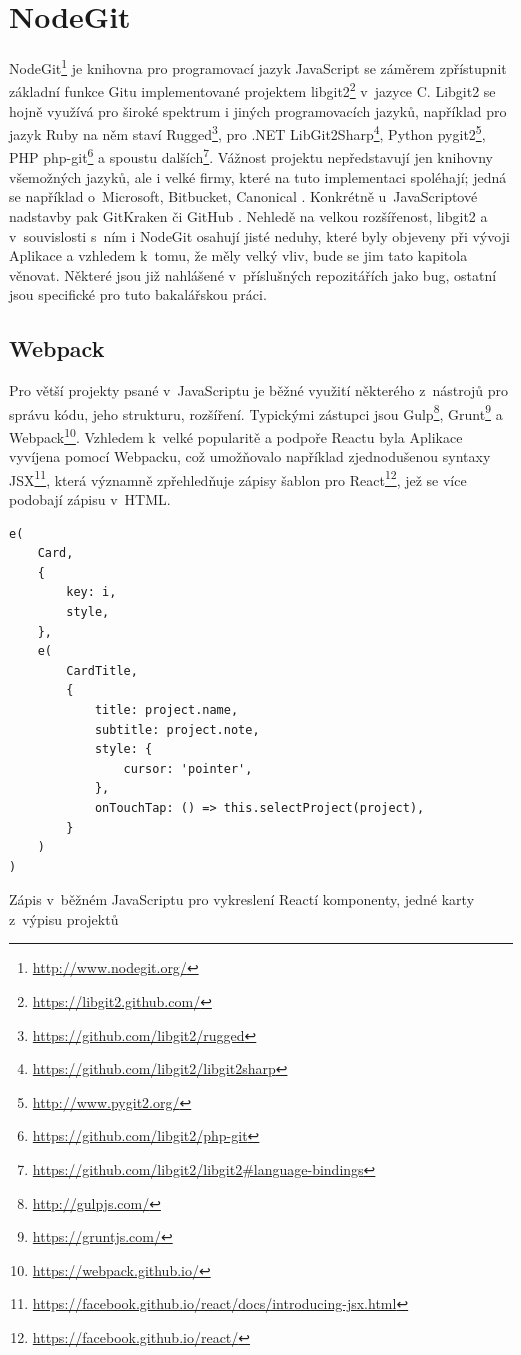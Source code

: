 \chapter{NodeGit}

NodeGit\footnote{\url{http://www.nodegit.org/}} je knihovna pro programovací jazyk JavaScript se záměrem zpřístupnit základní funkce Gitu implementované projektem libgit2\footnote{\url{https://libgit2.github.com/}} v~jazyce C. Libgit2 se hojně využívá pro široké spektrum i jiných programovacích jazyků, například pro jazyk Ruby na něm staví Rugged\footnote{\url{https://github.com/libgit2/rugged}}, pro .NET LibGit2Sharp\footnote{\url{https://github.com/libgit2/libgit2sharp}}, Python pygit2\footnote{\url{http://www.pygit2.org/}}, PHP php-git\footnote{\url{https://github.com/libgit2/php-git}} a spoustu dalších\footnote{\url{https://github.com/libgit2/libgit2\#language-bindings}}. Vážnost projektu nepředstavují jen knihovny všemožných jazyků, ale i velké firmy, které na tuto implementaci spoléhají; jedná se například o~Microsoft, Bitbucket, Canonical \cite{libgit2-companies}. Konkrétně u~JavaScriptové nadstavby pak GitKraken či GitHub \cite{nodegit-products}. Nehledě na velkou rozšířenost, libgit2 a v~souvislosti s~ním i NodeGit osahují jisté neduhy, které byly objeveny při vývoji Aplikace a vzhledem k~tomu, že měly velký vliv, bude se jim tato kapitola věnovat. Některé jsou již nahlášené v~příslušných repozitářích jako bug, ostatní jsou specifické pro tuto bakalářskou práci.

\section{Webpack}

Pro větší projekty psané v~JavaScriptu je běžné využití některého z~nástrojů pro správu kódu, jeho strukturu, rozšíření. Typickými zástupci jsou Gulp\footnote{\url{http://gulpjs.com/}}, Grunt\footnote{\url{https://gruntjs.com/}} a Webpack\footnote{\url{https://webpack.github.io/}}. Vzhledem k~velké popularitě a podpoře Reactu byla Aplikace vyvíjena pomocí Webpacku, což umožňovalo například zjednodušenou syntaxy JSX\footnote{\url{https://facebook.github.io/react/docs/introducing-jsx.html}}, která významně zpřehledňuje zápisy šablon pro React\footnote{\url{https://facebook.github.io/react/}}, jež se více podobají zápisu v~HTML.

\begin{listing}[ht]
\begin{verbatim}
e(
	Card,
	{
		key: i,
		style,
	},
	e(
		CardTitle,
		{
			title: project.name,
			subtitle: project.note,
			style: {
				cursor: 'pointer',
			},
			onTouchTap: () => this.selectProject(project),
		}
	)
)
\end{verbatim}
\caption[Komponenta v~JavaScriptu]{Zápis v~běžném JavaScriptu pro vykreslení Reactí komponenty, jedné karty z~výpisu projektů}
\end{listing}

